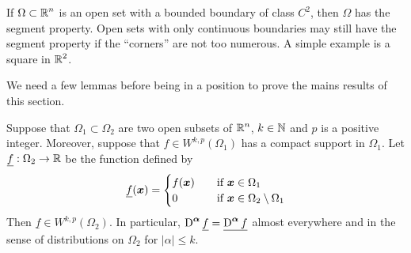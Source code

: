 
If $\displaystyle \Omega \subset \mathbb{R}^n$ is an open set with a bounded
boundary of class $\displaystyle C^2$, then $\Omega$ has the segment
property.  Open sets with only continuous boundaries may still have
the segment property if the ``corners'' are not too numerous.  A
simple example is a square in $\displaystyle \mathbb{R}^2$.

We need a few lemmas before being in a position to prove the mains
results of this section.

\begin{lemma} \label{sob_denselem1}
Suppose that $\Omega_1 \subset \Omega_2$ are two open subsets of
$\displaystyle \mathbb{R}^n$, $k\in \mathbb{N}$ and $p$ is a positive integer.
Moreover, suppose that $\displaystyle f \in W^{k,p}(\Omega_1)$ has a
compact support in $\Omega_1$.
Let $\underline{f}:\Omega_2 \to \mathbb{R}$ be the function defined by
\[
\underline{f}({\bm{x}}) =
\begin{cases}
f({\bm{x}}) & \quad \text{if} \ {\bm{x}} \in \Omega_1 \\
0 & \quad \text{if} \ {\bm{x}} \in \Omega_2 \setminus \Omega_1
\end{cases}
\]
Then $\displaystyle \underline{f} \in W^{k,p}(\Omega_2)$.  In particular,
$\displaystyle \operatorname{D}^{{\bm{\alpha}}} \underline{f}
= \underline{\operatorname{D}^{{\bm{\alpha}}} f}$
almost everywhere and in the sense of distributions on $\Omega_2$
for $|\alpha|\leq k$.
\end{lemma}

